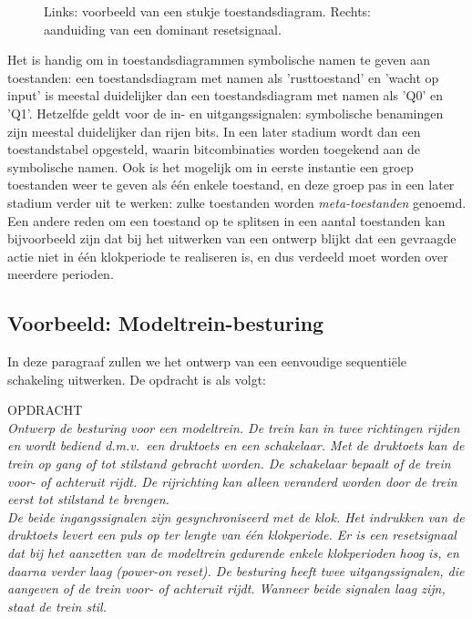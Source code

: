 \begin{figure}[bth]
\centerline{}
\caption{Links: voorbeeld van een stukje toestandsdiagram.
Rechts: aanduiding van een dominant resetsignaal.}
\label{figuur:toestand_vb}
\end{figure}

Het is handig om in toestandsdiagrammen symbolische
namen te geven aan toestanden: een toestandsdiagram
met namen als 'rusttoestand' en 'wacht op input' is meestal duidelijker
dan een toestandsdiagram met namen als 'Q0' en 'Q1'.
Hetzelfde geldt voor de in- en uitgangssignalen: symbolische
benamingen zijn meestal duidelijker dan rijen bits.
In een later stadium wordt dan een toestandstabel opgesteld, waarin
bitcombinaties worden toegekend aan de symbolische namen. 
Ook is het mogelijk om in eerste instantie een groep toestanden weer te
geven als \'e\'en enkele toestand, en deze groep pas in een later
stadium verder uit te werken: zulke toestanden worden {\em meta-toestanden\/}
genoemd.
Een andere reden om een toestand op te splitsen in een aantal toestanden
kan bijvoorbeeld zijn dat bij het uitwerken van een ontwerp blijkt dat een
gevraagde actie
niet in \'e\'en klokperiode te realiseren is, en dus verdeeld moet worden
over meerdere perioden.

\subsection {Voorbeeld: Modeltrein-besturing}
In deze paragraaf zullen we 
het ontwerp van een eenvoudige sequenti\"ele
schakeling uitwerken.
De opdracht is als volgt:

OPDRACHT \\ 
{\em Ontwerp de besturing voor een modeltrein. De trein kan
in twee richtingen rijden en wordt bediend
d.m.v.\ een druktoets en een schakelaar.
Met de druktoets kan de trein op gang of tot stilstand gebracht
worden.
De schakelaar bepaalt of de trein voor- of achteruit
rijdt.
De rijrichting kan alleen veranderd worden door de trein
eerst tot stilstand te brengen. \\
De beide ingangssignalen zijn gesynchroniseerd met de klok.
Het indrukken van de druktoets levert een puls op ter
lengte van \'e\'en klokperiode.
Er is een resetsignaal dat
bij het aanzetten van de modeltrein gedurende enkele
klokperioden hoog is, en daarna verder laag (power-on reset).
De besturing heeft twee uitgangssignalen, die aangeven of
de trein voor- of achteruit rijdt.
Wanneer beide signalen laag zijn, staat de trein stil.}

